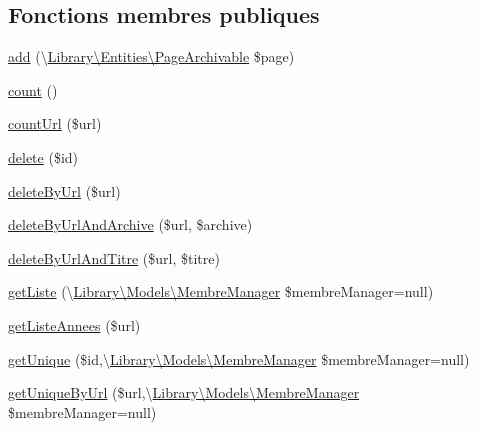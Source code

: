 \subsection*{Fonctions membres publiques}
\begin{DoxyCompactItemize}
\item 
\hyperlink{class_library_1_1_models_1_1_page_archivable_manager___p_d_o_a148f6fc8b26188ff3c990f2deda6e17a}{add} (\textbackslash{}\hyperlink{class_library_1_1_entities_1_1_page_archivable}{Library\textbackslash{}\+Entities\textbackslash{}\+Page\+Archivable} \$page)
\item 
\hyperlink{class_library_1_1_models_1_1_page_archivable_manager___p_d_o_ac751e87b3d4c4bf2feb03bee8b092755}{count} ()
\item 
\hyperlink{class_library_1_1_models_1_1_page_archivable_manager___p_d_o_a4d5b7bba438b0d7e954b84ba2f4e6aca}{count\+Url} (\$url)
\item 
\hyperlink{class_library_1_1_models_1_1_page_archivable_manager___p_d_o_a2f8258add505482d7f00ea26493a5723}{delete} (\$id)
\item 
\hyperlink{class_library_1_1_models_1_1_page_archivable_manager___p_d_o_ae7695b0ed10f2aa20708606d5a4c54dc}{delete\+By\+Url} (\$url)
\item 
\hyperlink{class_library_1_1_models_1_1_page_archivable_manager___p_d_o_a5e7c0bb0071967b0bbaf4ce5e657962a}{delete\+By\+Url\+And\+Archive} (\$url, \$archive)
\item 
\hyperlink{class_library_1_1_models_1_1_page_archivable_manager___p_d_o_a3bf67f20497b82d53f6ed33439c6eff2}{delete\+By\+Url\+And\+Titre} (\$url, \$titre)
\item 
\hyperlink{class_library_1_1_models_1_1_page_archivable_manager___p_d_o_ab569f8e7e64b40e73bb4602d0100949a}{get\+Liste} (\textbackslash{}\hyperlink{class_library_1_1_models_1_1_membre_manager}{Library\textbackslash{}\+Models\textbackslash{}\+Membre\+Manager} \$membre\+Manager=null)
\item 
\hyperlink{class_library_1_1_models_1_1_page_archivable_manager___p_d_o_a90f86d4cb388f5513a9a205921af0024}{get\+Liste\+Annees} (\$url)
\item 
\hyperlink{class_library_1_1_models_1_1_page_archivable_manager___p_d_o_a6813dfac681bc517ce0a9608f48367f3}{get\+Unique} (\$id,\textbackslash{}\hyperlink{class_library_1_1_models_1_1_membre_manager}{Library\textbackslash{}\+Models\textbackslash{}\+Membre\+Manager} \$membre\+Manager=null)
\item 
\hyperlink{class_library_1_1_models_1_1_page_archivable_manager___p_d_o_af0e5053789c8ab10d26dff9390e9e3b1}{get\+Unique\+By\+Url} (\$url,\textbackslash{}\hyperlink{class_library_1_1_models_1_1_membre_manager}{Library\textbackslash{}\+Models\textbackslash{}\+Membre\+Manager} \$membre\+Manager=null)

\end{DoxyCompactItemize}
